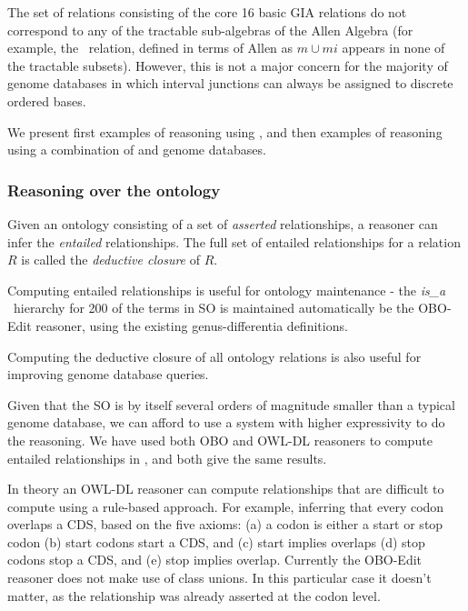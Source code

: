 \documentclass{article}
\newcommand{\tr}[1]{\textit{#1} }
\def\isA{\tr{is\_a}}
\def\adjacentTo{\pr{adjacent\_to}}
\def\SOGI{\pr{SO$^{+}$}}
\begin{document}
The set of relations consisting of the core 16 basic GIA relations do
not correspond to any of the tractable sub-algebras of the Allen
Algebra (for example, the \adjacentTo\ relation, defined in terms of
Allen as $m \cup mi$ appears in none of the tractable
subsets). However, this is not a major concern for the majority of
genome databases in which interval junctions can always be assigned to
discrete ordered bases.

We present first examples of reasoning using \SOGI, and then examples
of reasoning using a combination of \SOGI and genome databases.

\subsubsection{Reasoning over the ontology}

Given an ontology consisting of a set of \emph{asserted}
relationships, a reasoner can infer the \emph{entailed}
relationships. The full set of entailed relationships for a relation
$R$ is called the \emph{deductive closure} of $R$.

Computing entailed relationships is useful for ontology maintenance -
the \isA\ hierarchy for 200 of the terms in SO is maintained
automatically be the OBO-Edit reasoner, using the existing
genus-differentia definitions.

Computing the deductive closure of all ontology relations is also
useful for improving genome database queries.

Given that the SO is by itself several orders of magnitude smaller
than a typical genome database, we can afford to use a system with
higher expressivity to do the reasoning. We have used both OBO and
OWL-DL reasoners to compute entailed relationships in \SOGI, and both
give the same results.

In theory an OWL-DL reasoner can compute relationships that are
difficult to compute using a rule-based approach. For example,
inferring that every codon overlaps a CDS, based on the five axioms:
(a) a codon is either a start or stop codon (b) start codons start a
CDS, and (c) start implies overlaps (d) stop codons stop a CDS, and
(e) stop implies overlap. Currently the OBO-Edit reasoner does not
make use of class unions. In this particular case it doesn't matter,
as the relationship was already asserted at the codon level.

\end{document}
